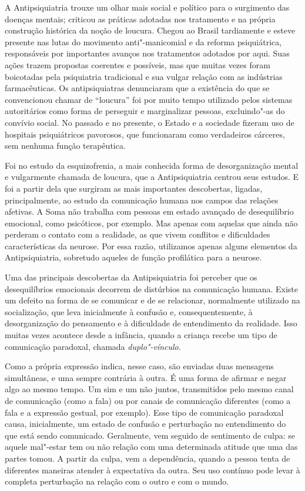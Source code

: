 A Antipsiquiatria trouxe um olhar mais social e político para o
surgimento das doenças mentais; criticou as práticas adotadas nos
tratamento e na própria construção histórica da noção de loucura. Chegou
ao Brasil tardiamente e esteve presente nas lutas do movimento
anti"-manicomial e da reforma psiquiátrica, responsáveis por importantes
avanços nos tratamentos adotados por aqui. Suas ações trazem propostas
coerentes e possíveis, mas que muitas vezes foram boicotadas pela
psiquiatria tradicional e sua vulgar relação com as indústrias
farmacêuticas. Os antipsiquiatras denunciaram que a existência do que se
convencionou chamar de ``loucura'' foi por muito tempo utilizado pelos
sistemas autoritários como forma de perseguir e marginalizar pessoas,
excluindo"-as do convívio social. No passado e no presente, o Estado e a
sociedade fizeram uso de hospitais psiquiátricos pavorosos, que
funcionaram como verdadeiros cárceres, sem nenhuma função terapêutica.

Foi no estudo da esquizofrenia, a mais conhecida forma de desorganização
mental e vulgarmente chamada de loucura, que a Antipsiquiatria centrou
seus estudos. E foi a partir dela que surgiram as mais importantes
descobertas, ligadas, principalmente, ao estudo da comunicação humana
nos campos das relações afetivas. A Soma não trabalha com pessoas em
estado avançado de desequilíbrio emocional, como psicóticos, por
exemplo. Mas apenas com aquelas que ainda não perderam o contato com a
realidade, as que vivem conflitos e dificuldades características da
neurose. Por essa razão, utilizamos apenas alguns elementos da
Antipsiquiatria, sobretudo aqueles de função profilática para a neurose.

Uma das principais descobertas da Antipsiquiatria foi perceber que os
desequilíbrios emocionais decorrem de distúrbios na comunicação humana.
Existe um defeito na forma de se comunicar e de se relacionar,
normalmente utilizado na socialização, que leva inicialmente à confusão
e, consequentemente, à desorganização do pensamento e à dificuldade de
entendimento da realidade. Isso muitas vezes acontece desde a infância,
quando a criança recebe um tipo de comunicação paradoxal, chamada
\emph{duplo"-vínculo}.

Como a própria expressão indica, nesse caso, são enviadas duas mensagens
simultâneas, e uma sempre contrária à outra. É uma forma de afirmar e
negar algo ao mesmo tempo. Um sim e um não juntos, transmitidos pelo
mesmo canal de comunicação (como a fala) ou por canais de comunicação
diferentes (como a fala e a expressão gestual, por exemplo). Esse tipo
de comunicação paradoxal causa, inicialmente, um estado de confusão e
perturbação no entendimento do que está sendo comunicado. Geralmente,
vem seguido de sentimento de culpa: se aquele mal"-estar tem ou não
relação com uma determinada atitude que uma das partes tomou. A partir
da culpa, vem a dependência, quando a pessoa tenta de diferentes
maneiras atender à expectativa da outra. Seu uso contínuo pode levar à
completa perturbação na relação com o outro e com o mundo.

